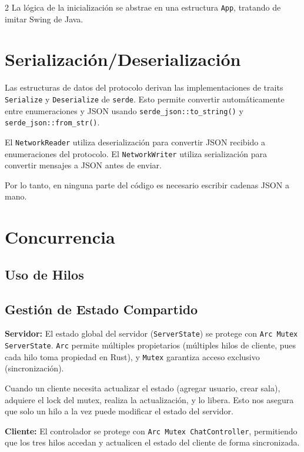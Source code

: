 \documentclass[letter,11pt]{article}
\begin{document}
\begin{multicols}{2}
La lógica de la inicialización se abstrae en una estructura \texttt{App}, tratando de imitar Swing de Java.


\section{Serialización/Deserialización}

Las estructuras de datos del protocolo derivan las implementaciones de traits \texttt{Serialize} y \texttt{Deserialize} de \texttt{serde}.
Esto permite convertir automáticamente entre enumeraciones y JSON usando \texttt{serde\_json::to\_string()} y \texttt{serde\_json::from\_str()}.

El \texttt{NetworkReader} utiliza deserialización para convertir JSON recibido a enumeraciones del protocolo.
El \texttt{NetworkWriter} utiliza serialización para convertir mensajes a JSON antes de enviar.

Por lo tanto, en ninguna parte del código es necesario escribir cadenas JSON a mano.

\section{Concurrencia}

\subsection{Uso de Hilos}

\subsection{Gestión de Estado Compartido}

\textbf{Servidor:} El estado global del servidor (\texttt{ServerState}) se protege con \texttt{Arc Mutex ServerState}. \texttt{Arc} permite múltiples propietarios (múltiples hilos de cliente, pues cada hilo toma propiedad en Rust), y \texttt{Mutex} garantiza acceso exclusivo (sincronización).

Cuando un cliente necesita actualizar el estado (agregar usuario, crear sala), adquiere el lock del mutex, realiza la actualización, y lo libera.
Esto nos asegura que solo un hilo a la vez puede modificar el estado del servidor.

\textbf{Cliente:} El controlador se protege con \texttt{Arc Mutex ChatController}, permitiendo que los tres hilos accedan y actualicen el estado del cliente de forma sincronizada.


\end{multicols}
\end{document}
